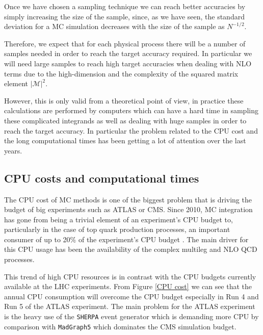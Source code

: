 \documentclass[../main/main.tex]{subfiles}
\begin{document}
Once we have chosen a sampling technique we can reach better accuracies by simply increasing the size of the sample, since, as we have seen, the 
standard deviation for a MC simulation decreases with the size of the sample as $N^{-1/2}$.

Therefore, we expect that for each physical process there will be a number of samples needed in order to reach the target accuracy required. 
In particular we will need large samples to reach high target accuracies when dealing with NLO terms due to the high-dimension and the 
complexity of the squared matrix element $|\mathcal{M}|^2$.

However, this is only valid from a theoretical point of view, in practice these calculations are performed by computers which can have a hard time
in sampling these complicated integrands as well as dealing with huge samples in order to reach the target accuracy.
In particular the problem related to the CPU cost and the long computational times has been getting a lot of attention over the last years.



\subsection{CPU costs and computational times}
\label{cost}
The CPU cost of MC methods is one of the biggest problem that is driving the budget of big experiments such as ATLAS or CMS.
Since 2010, MC integration has gone from being a trivial element of an experiment's CPU budget to, particularly in the case of top 
quark production processes, an important consumer of up to 20\% of the experiment's CPU budget \cite{Buckley:2019wov}. 
The main driver for this CPU usage has been the availability of the complex multileg and NLO QCD processes. 

This trend of high CPU resources  is in contrast with the CPU budgets currently available at the LHC experiments.   
From Figure \ref{CPU cost} we can see that the annual CPU consumption will overcome the CPU budget especially in Run 4 and Run 5 of the ATLAS
experiment. 
The main problem for the ATLAS experiment is the heavy use of the \texttt{SHERPA} \cite{Gleisberg:2008ta} event generator which is demanding more CPU  by comparison with
\texttt{MadGraph5} \cite{Alwall:2014hca} which dominates the CMS simulation budget. 
\end{document}
